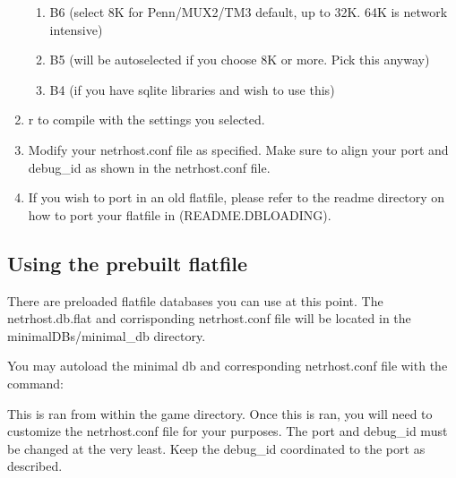 \documentclass[letterpaper,10pt,english]{sphinxmanual}
\begin{document}
\begin{enumerate}
\begin{enumerate}
\item {} 
\sphinxAtStartPar
B6 (select 8K for Penn/MUX2/TM3 default, up to 32K.  64K is network intensive)

\item {} 
\sphinxAtStartPar
B5 (will be autoselected if you choose 8K or more.  Pick this anyway)

\item {} 
\sphinxAtStartPar
B4 (if you have sqlite libraries and wish to use this)

\end{enumerate}

\item {} 
\sphinxAtStartPar
\textquotesingle{}r\textquotesingle{} to compile with the settings you selected.

\item {} 
\sphinxAtStartPar
Modify your netrhost.conf file as specified.  Make sure to align your port and debug\_id as shown in the netrhost.conf file.

\item {} 
\sphinxAtStartPar
If you wish to port in an old flatfile, please refer to the readme directory on how to port your flatfile in (README.DBLOADING).

\end{enumerate}


\subsection{Using the prebuilt flatfile}
\label{\detokenize{install:using-the-prebuilt-flatfile}}
\sphinxAtStartPar
There are pre\sphinxhyphen{}loaded flatfile databases you can use at this point.  The netrhost.db.flat
and corrisponding netrhost.conf file will be located in the minimal\sphinxhyphen{}DBs/minimal\_db directory.

\sphinxAtStartPar
You may auto\sphinxhyphen{}load the minimal db and corresponding netrhost.conf file with the command:

\begin{sphinxVerbatim}[commandchars=\\\{\}]
\end{sphinxVerbatim}

\sphinxAtStartPar
This is ran from within the \textquotesingle{}game\textquotesingle{} directory.  Once this is ran, you will need
to customize the netrhost.conf file for your purposes.  The port and debug\_id must
be changed at the very least.  Keep the debug\_id coordinated to the port as described.
\end{document}

